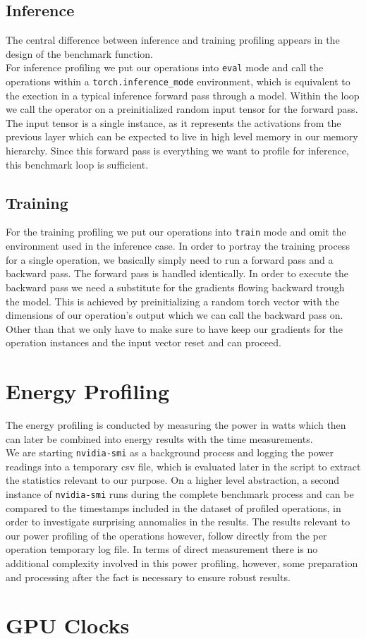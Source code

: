 \subsection{Inference}
The central difference between inference and training profiling appears in the design of the benchmark function. \\
For inference profiling we put our operations into \texttt{eval} mode and call the operations within a \texttt{torch.inference\_mode} environment, which is equivalent to the exection in a typical inference forward pass through a model. Within the loop we call the operator on a preinitialized random input tensor for the forward pass. The input tensor is a single instance, as it represents the activations from the previous layer which can be expected to live in high level memory in our memory hierarchy. Since this forward pass is everything we want to profile for inference, this benchmark loop is sufficient.

\subsection{Training}
For the training profiling we put our operations into \texttt{train} mode and omit the environment used in the inference case. In order to portray the training process for a single operation, we basically simply need to run a forward pass and a backward pass. The forward pass is handled identically. In order to execute the backward pass we need a substitute for the gradients flowing backward trough the model. This is achieved by preinitializing a random torch vector with the dimensions of our operation's output which we can call the backward pass on. Other than that we only have to make sure to have keep our gradients for the operation instances and the input vector reset and can proceed.


\section{Energy Profiling}

The energy profiling is conducted by measuring the power in watts which then can later be combined into energy results with the time measurements. \\
We are starting \texttt{nvidia-smi} as a background process and logging the power readings into a temporary csv file, which is evaluated later in the script to extract the statistics relevant to our purpose. On a higher level abstraction, a second instance of \texttt{nvidia-smi} runs during the complete benchmark process and can be compared to the timestamps included in the dataset of profiled operations, in order to investigate surprising annomalies in the results. The results relevant to our power profiling of the operations however, follow directly from the per operation temporary log file. In terms of direct measurement there is no additional complexity involved in this power profiling, however, some preparation and processing after the fact is necessary to ensure robust results. 

\section{GPU Clocks}